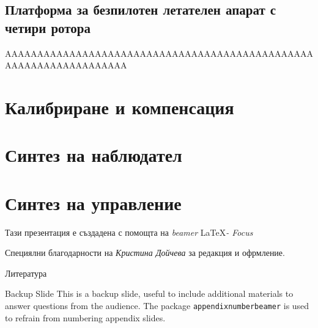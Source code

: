 \documentclass[handout]{beamer}
\begin{document}
\subsection{Платформа за безпилотен летателен апарат с четири ротора}


\begin{frame}{}
AAAAAAAAAAAAAAAAAAAAAAAAAAAAAAAAAAAAAAAAAAAAAAAAAAAAAAAAAAAAAAAAAAA
\end{frame}

\section{Калибриране и компенсация}

\section{Синтез на наблюдател}

\section{Синтез на управление}




\begin{frame}[focus]
	Тази презентация е създадена с помощта на \textit{beamer} \LaTeX \textit{- Focus}
\end{frame}

\begin{frame}[focus]
	Специялни благодарности на \textit{Кристина Дойчева} за редакция и офрмление.
\end{frame}



\appendix

\begin{frame}{Литература}
	\nocite{*} %
	
	
\end{frame}


\begin{frame}{Backup Slide}
	This is a backup slide, useful to include additional materials to answer questions from the audience.
	\vfill
	The package \texttt{appendixnumberbeamer} is used to refrain from numbering appendix slides.
\end{frame}

\end{document}
